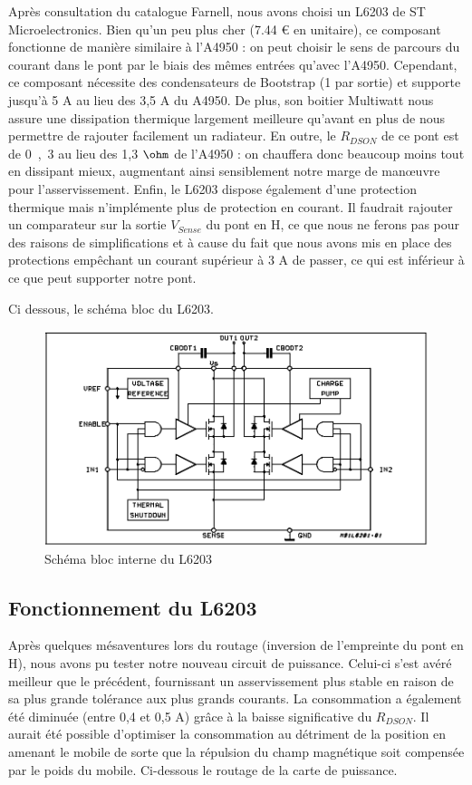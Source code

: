 \documentclass[11pt, french]{article} %
\begin{document}
Après consultation du catalogue Farnell, nous avons choisi un L6203 de ST Microelectronics. Bien qu'un peu plus cher (7.44 \euro{} en unitaire), ce composant fonctionne de manière similaire à l'A4950 : on peut choisir le sens de parcours du courant dans le pont par le biais des mêmes entrées qu'avec l'A4950. Cependant, ce composant nécessite des condensateurs de Bootstrap (1 par sortie) et supporte jusqu'à 5 A au lieu des 3,5 A du A4950. De plus, son boitier Multiwatt nous assure une dissipation thermique largement meilleure qu'avant en plus de nous permettre de rajouter facilement un radiateur. En outre, le $R_{DSON}$ de ce pont est de \unit{0,3}{\ohm} au lieu des 1,3 $\ohm$ de l'A4950 : on chauffera donc beaucoup moins tout en dissipant mieux, augmentant ainsi sensiblement notre marge de manœuvre pour l'asservissement. Enfin, le L6203 dispose également d'une protection thermique mais n'implémente plus de protection en courant. Il faudrait rajouter un comparateur sur la sortie $V_{Sense}$ du pont en H, ce que nous ne ferons pas pour des raisons de simplifications et à cause du fait que nous avons mis en place des protections empêchant un courant supérieur à 3 A de passer, ce qui est inférieur à ce que peut supporter notre pont. 


Ci dessous, le schéma bloc du L6203. 

\begin{figure}[h!]
	\centering
	\includegraphics[width = 12cm]{SolutionNumerique/fonc_sch.png} 
	\caption{Schéma bloc interne du L6203}
\end{figure}

\subsection{Fonctionnement du L6203}

Après quelques mésaventures lors du routage (inversion de l'empreinte du pont en H), nous avons pu tester notre nouveau circuit de puissance. Celui-ci s'est avéré meilleur que le précédent, fournissant un asservissement plus stable en raison de sa plus grande tolérance aux plus grands courants. La consommation a également été diminuée (entre 0,4 et 0,5 A) grâce à la baisse significative du $R_{DSON}$. Il aurait été possible d'optimiser la consommation au détriment de la position en amenant le mobile de sorte que la répulsion du champ magnétique soit compensée par le poids du mobile. Ci-dessous le routage de la carte de puissance. 
\end{document}
